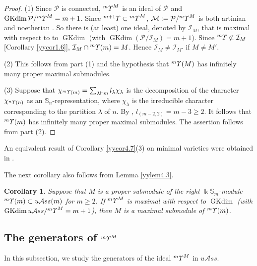 \documentclass{amsart}
\newtheorem{cor}[thm]{Corollary}
\theoremstyle{definition}
\theoremstyle{remark}
\numberwithin{equation}{section}
\def\S{\mathbb{S}}
\newcommand{\up}[1]{{^{#1}{\it \!\Upsilon}}}
\def\la{\lambda}
\def \uas{u\mathcal{A}ss}
\def \I{\mathcal{I}}
\def \ip{{\mathcal{P}}}
\def\gkdim{\operatorname{GKdim}}
\def \S{\mathbb{S}}
\begin{document}
\begin{proof}
(1) Since $\ip$ is connected, $\up{m}^{M}$ is an ideal
of $\ip$ and $\gkdim \ip/\up{m}^{M}=m+1$. Since 
$\up{m+1}\subset \up{m}^M$, ${\mathcal M}:
=\ip/\up{m}^M$ is both artinian and noetherian 
\cite[Theorem 0.3]{BYZ}. So there is (at least) one 
ideal, denoted by $\I_{M}$, that is maximal 
with respect to to $\gkdim$ {\rm{(}}with 
$\gkdim (\ip/\I_{M})=m+1${\rm{)}}. Since $\up{m}
\not\subset \I_{M}$ [Corollary \ref{yycor1.6}], $\I_{M}
\cap \up{m}(m)=M$. Hence $\I_{M}\neq \I_{M'}$ 
if $M\neq M'$. 

(2) This follows from part (1) and the hypothesis that 
$\up{m}(M)$ has infinitely many proper maximal submodules. 

(3) 
Suppose that $\chi_{\up{m}(m)}=\sum_{\la\vdash m}l_\la \chi_\la$ 
is the decomposition of the character $\chi_{\up{n}(n)}$ 
as an $\S_n$-representation, where $\chi_\la$ is the 
irreducible character corresponding to the partition $\la$ 
of $n$. By \cite[Proposition 4.7]{JSV}, $l_{(m-2, 2)}=m-3\ge 2$.
It follows that $\up{m}(m)$ has infinitely many proper 
maximal submodules. The assertion follows from part (2). 
\end{proof}

An equivalent result of Corollary \ref{yycor4.7}(3) on minimal 
varieties were obtained in \cite{GMZ}. 

The next corollary also follows from Lemma \ref{yylem4.3}.

\begin{cor}
\label{yycor4.8}
Suppose that $M$ is a proper submodule of the right 
$\Bbbk\S_m$-module $\up{m}(m)\subset \uas(m)$ for $m\geq 2$. 
If $\up{m}^M$ is maximal with respect to $\gkdim$
{\rm{(}}with $\gkdim \uas/\up{m}^M=m+1${\rm{)}}, 
then $M$ is a maximal submodule of $\up{m}(m)$. 
\end{cor}

\subsection{The generators of $\up{m}^M$}
\label{yysec4.3}
In this subsection, we study the generators of the 
ideal $\up{m}^M$ in $\uas$. 
\end{document}
